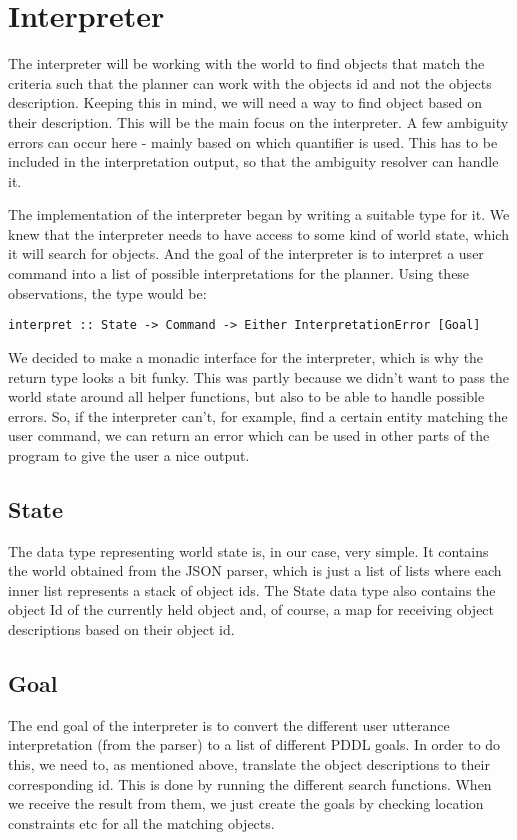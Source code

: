 \section*{Interpreter}
The interpreter will be working with the world to find objects that match the criteria such that the planner can work with the objects id and not the objects description. Keeping this in mind, we will need a way to find object based on their description. This will be the main focus on the interpreter. A few ambiguity errors can occur here - mainly based on which quantifier is used. This has to be included in the interpretation output, so that the ambiguity resolver can handle it.

The implementation of the interpreter began by writing a suitable type for it.
We knew that the interpreter needs to have access to some kind of world state, which it will search for objects.
And the goal of the interpreter is to interpret a user command into a list of possible interpretations for the planner.
Using these observations, the type would be:

\begin{lstlisting}
interpret :: State -> Command -> Either InterpretationError [Goal]
\end{lstlisting}

We decided to make a monadic interface for the interpreter, which is why the return type looks a bit funky.
This was partly because we didn't want to pass the world state around all helper functions, but also to be able to handle possible errors.
So, if the interpreter can't, for example, find a certain entity matching the user command, we can return an error which can be used in other parts of the program to give the user a nice output.

\subsection*{State}
The data type representing world state is, in our case, very simple.
It contains the world obtained from the JSON parser, which is just a list of lists where each inner list represents a stack of object ids.
The State data type also contains the object Id of the currently held object and, of course, a map for receiving object descriptions based on their object id.

\subsection*{Goal}
The end goal of the interpreter is to convert the different user utterance interpretation (from the parser) to a list of different PDDL goals.
In order to do this, we need to, as mentioned above, translate the object descriptions to their corresponding id.
This is done by running the different search functions.
When we receive the result from them, we just create the goals by checking location constraints etc for all the matching objects.

